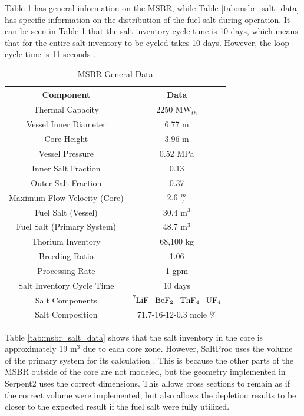 Table \ref{tab:msbr_gen_data} has general information on the MSBR, while Table \ref{tab:msbr_salt_data} has specific information on the distribution of the fuel salt during operation. It can be seen in Table \ref{tab:msbr_gen_data} that the salt inventory cycle time is 10 days, which means that for the entire salt inventory to be cycled takes 10 days. However, the loop cycle time is 11 seconds \cite{robertson_conceptual_1971}.

\begin{table}[H]
\renewcommand{\arraystretch}{1.25}
\caption{MSBR General Data \cite{robertson_conceptual_1971}}
\label{tab:msbr_gen_data}
\begin{center}
\begin{tabular}{ | c | c | }
 \hline
 Component & Data\\
 \hline
 \hline
 Thermal Capacity & 2250 MW$_{th}$\\
 Vessel Inner Diameter & 6.77 m\\
 Core Height & 3.96 m\\
 Vessel Pressure & 0.52 MPa\\
 Inner Salt Fraction & 0.13\\
 Outer Salt Fraction & 0.37\\
 Maximum Flow Velocity (Core) & 2.6 $\frac{m}{s}$\\
 Fuel Salt (Vessel) & 30.4 m$^3$\\
 Fuel Salt (Primary System) & 48.7 m$^3$\\
 Thorium Inventory & 68,100 kg\\
 Breeding Ratio & 1.06\\
 Processing Rate & 1 gpm\\
 Salt Inventory Cycle Time & 10 days\\
 Salt Components & $\ce{^{7}LiF-BeF_{2}-ThF_{4}-UF_{4}} $\\
 Salt Composition & 71.7-16-12-0.3 mole \% \\
 \hline
\end{tabular}
\end{center}
\end{table}

Table \ref{tab:msbr_salt_data} shows that the salt inventory in the core is approximately 19 m$^3$ due to each core zone. However, SaltProc uses the volume of the primary system for its calculation \cite{rykhlevskii_modeling_2019}. This is because the other parts of the MSBR outside of the core are not modeled, but the geometry implemented in Serpent2 uses the correct dimensions. This allows cross sections to remain as if the correct volume were implemented, but also allows the depletion results to be closer to the expected result if the fuel salt were fully utilized.



